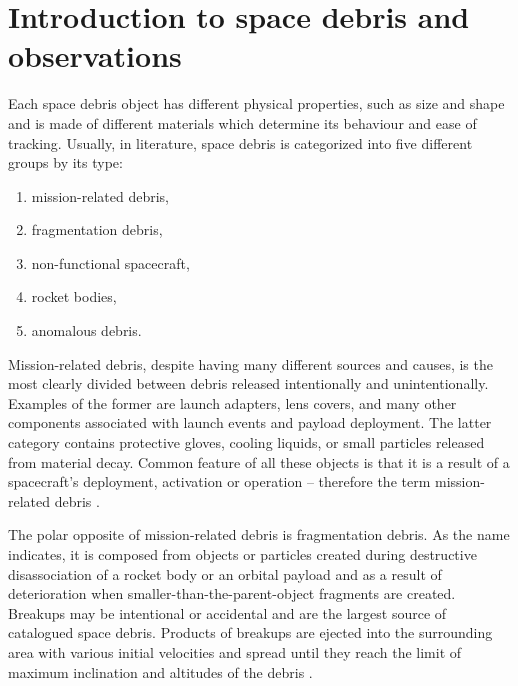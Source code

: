\chapter{Introduction to space debris and observations}\label{chap:introduction}

	Each space debris object has different physical properties, such as size and shape and is made of different materials which determine its behaviour and ease of tracking. Usually, in literature, space debris is categorized into five different groups by its type:
	
\begin{enumerate}
	\item mission-related debris,
	\item fragmentation debris,
	\item non-functional spacecraft,
	\item rocket bodies,
	\item anomalous debris.
\end{enumerate}

	Mission-related debris, despite having many different sources and causes, is the most clearly divided between debris released intentionally and unintentionally. Examples of the former are launch adapters, lens covers, and many other components associated with launch events and payload deployment. The latter category contains protective gloves, cooling liquids, or small particles released from material decay. Common feature of all these objects is that it is a result of a spacecraft's deployment, activation or operation -- therefore the term mission-related debris \citep{klinkrad2006space}. 
	
	The polar opposite of mission-related debris is fragmentation debris. As the name indicates, it is composed from objects or particles created during destructive disassociation of a rocket body or an orbital payload and as a result of deterioration when smaller-than-the-parent-object fragments are created. Breakups may be intentional or accidental and are the largest source of catalogued space debris. Products of breakups are ejected into the surrounding area with various initial velocities and spread until they reach the limit of maximum inclination and altitudes of the debris \citep{united1999technical}.
	

